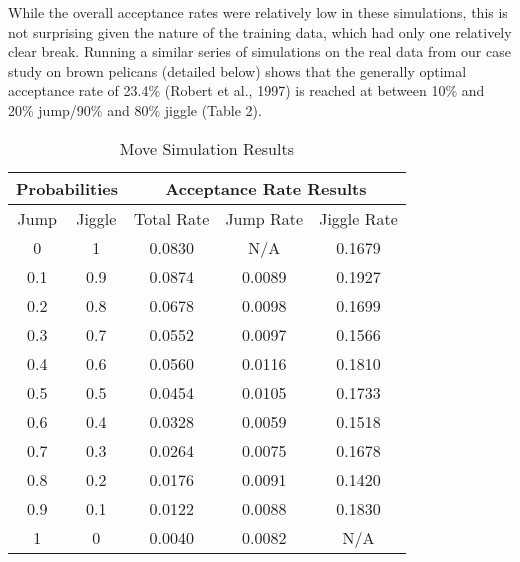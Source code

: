 \documentclass[submit]{smj}
\begin{document}
While the overall acceptance rates were relatively low in these simulations, this is not surprising given the nature of the training data, which had only one relatively clear break. Running a similar series of simulations on the real data from our case study on brown pelicans (detailed below) shows that the generally optimal acceptance rate of 23.4\% (Robert et al., 1997) is reached at between 10\% and 20\% jump/90\% and 80\% jiggle (Table 2).

\begin{table}[ht]
\caption{Move Simulation Results}
\begin{center}
\begin{tabular}{| c | c || c || c | c |}
 \hline
 \multicolumn{2}{|c||}{\textbf{Probabilities}}  &  \multicolumn{3}{|c|}{\textbf{Acceptance Rate Results}}\\ 
 \hline
 Jump & Jiggle &  Total Rate & Jump Rate & Jiggle Rate\\  
 \hline
 0 & 1 &  0.0830 & N/A & 0.1679\\
 0.1 & 0.9 &  0.0874 & 0.0089 & 0.1927\\
 0.2 & 0.8 &  0.0678 & 0.0098 & 0.1699\\
 0.3 & 0.7 &  0.0552 & 0.0097 & 0.1566\\ 
 0.4 & 0.6 &  0.0560 & 0.0116 & 0.1810\\
 0.5 & 0.5 &  0.0454 & 0.0105 & 0.1733\\
 0.6 & 0.4 &  0.0328 & 0.0059 & 0.1518\\
 0.7 & 0.3 &  0.0264 & 0.0075 & 0.1678\\ 
 0.8 & 0.2 &  0.0176 & 0.0091 & 0.1420\\
 0.9 & 0.1 &  0.0122 & 0.0088 & 0.1830\\
 1 & 0 &  0.0040 & 0.0082 & N/A\\
 \hline
\end{tabular}
\end{center}
\label{Move Simulation Results}
\end{table} 
\end{document}
